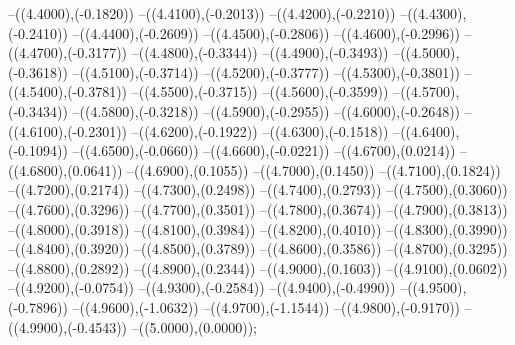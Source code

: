 {	--({\sx*(4.4000)},{\sy*(-0.1820)})
	--({\sx*(4.4100)},{\sy*(-0.2013)})
	--({\sx*(4.4200)},{\sy*(-0.2210)})
	--({\sx*(4.4300)},{\sy*(-0.2410)})
	--({\sx*(4.4400)},{\sy*(-0.2609)})
	--({\sx*(4.4500)},{\sy*(-0.2806)})
	--({\sx*(4.4600)},{\sy*(-0.2996)})
	--({\sx*(4.4700)},{\sy*(-0.3177)})
	--({\sx*(4.4800)},{\sy*(-0.3344)})
	--({\sx*(4.4900)},{\sy*(-0.3493)})
	--({\sx*(4.5000)},{\sy*(-0.3618)})
	--({\sx*(4.5100)},{\sy*(-0.3714)})
	--({\sx*(4.5200)},{\sy*(-0.3777)})
	--({\sx*(4.5300)},{\sy*(-0.3801)})
	--({\sx*(4.5400)},{\sy*(-0.3781)})
	--({\sx*(4.5500)},{\sy*(-0.3715)})
	--({\sx*(4.5600)},{\sy*(-0.3599)})
	--({\sx*(4.5700)},{\sy*(-0.3434)})
	--({\sx*(4.5800)},{\sy*(-0.3218)})
	--({\sx*(4.5900)},{\sy*(-0.2955)})
	--({\sx*(4.6000)},{\sy*(-0.2648)})
	--({\sx*(4.6100)},{\sy*(-0.2301)})
	--({\sx*(4.6200)},{\sy*(-0.1922)})
	--({\sx*(4.6300)},{\sy*(-0.1518)})
	--({\sx*(4.6400)},{\sy*(-0.1094)})
	--({\sx*(4.6500)},{\sy*(-0.0660)})
	--({\sx*(4.6600)},{\sy*(-0.0221)})
	--({\sx*(4.6700)},{\sy*(0.0214)})
	--({\sx*(4.6800)},{\sy*(0.0641)})
	--({\sx*(4.6900)},{\sy*(0.1055)})
	--({\sx*(4.7000)},{\sy*(0.1450)})
	--({\sx*(4.7100)},{\sy*(0.1824)})
	--({\sx*(4.7200)},{\sy*(0.2174)})
	--({\sx*(4.7300)},{\sy*(0.2498)})
	--({\sx*(4.7400)},{\sy*(0.2793)})
	--({\sx*(4.7500)},{\sy*(0.3060)})
	--({\sx*(4.7600)},{\sy*(0.3296)})
	--({\sx*(4.7700)},{\sy*(0.3501)})
	--({\sx*(4.7800)},{\sy*(0.3674)})
	--({\sx*(4.7900)},{\sy*(0.3813)})
	--({\sx*(4.8000)},{\sy*(0.3918)})
	--({\sx*(4.8100)},{\sy*(0.3984)})
	--({\sx*(4.8200)},{\sy*(0.4010)})
	--({\sx*(4.8300)},{\sy*(0.3990)})
	--({\sx*(4.8400)},{\sy*(0.3920)})
	--({\sx*(4.8500)},{\sy*(0.3789)})
	--({\sx*(4.8600)},{\sy*(0.3586)})
	--({\sx*(4.8700)},{\sy*(0.3295)})
	--({\sx*(4.8800)},{\sy*(0.2892)})
	--({\sx*(4.8900)},{\sy*(0.2344)})
	--({\sx*(4.9000)},{\sy*(0.1603)})
	--({\sx*(4.9100)},{\sy*(0.0602)})
	--({\sx*(4.9200)},{\sy*(-0.0754)})
	--({\sx*(4.9300)},{\sy*(-0.2584)})
	--({\sx*(4.9400)},{\sy*(-0.4990)})
	--({\sx*(4.9500)},{\sy*(-0.7896)})
	--({\sx*(4.9600)},{\sy*(-1.0632)})
	--({\sx*(4.9700)},{\sy*(-1.1544)})
	--({\sx*(4.9800)},{\sy*(-0.9170)})
	--({\sx*(4.9900)},{\sy*(-0.4543)})
	--({\sx*(5.0000)},{\sy*(0.0000)});
}
